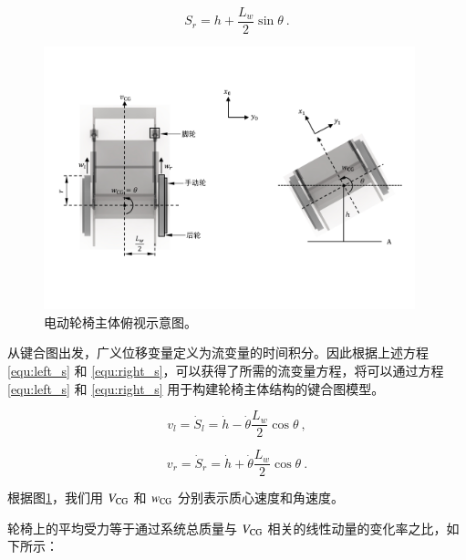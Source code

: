 	\begin{equation}
	\label{equ:right_s}
	S_r = h
	+
	\frac{L_w}{2} \sin \theta
	\ .
	\end{equation}
	
	\begin{figure}[!h]
		\centering
		\includegraphics[width=0.96\textwidth]{fig/top_view.pdf}
		\caption{电动轮椅主体俯视示意图。}\label{fig:top_view}
	\end{figure}
	
	从键合图出发，广义位移变量定义为流变量的时间积分。因此根据上述方程 \ref{equ:left_s} 和 \ref{equ:right_s}，可以获得了所需的流变量方程，将可以通过方程 \ref{equ:left_s} 和 \ref{equ:right_s} 用于构建轮椅主体结构的键合图模型。
	
	\begin{equation}
	\label{equ:left_v}
	v_{l}
	=
	\dot{S}_{l}
	=
	\dot{h}
	-
	\dot{\theta} \frac{L_w}{2} \cos \theta
	\ ,
	\end{equation}
	
	\begin{equation}
	\label{equ:right_v}
	v_{r}
	=
	\dot{S}_{r}
	=
	\dot{h}
	+
	\dot{\theta} \frac{L_w}{2} \cos \theta
	\ .
	\end{equation}
	
	根据图\ref{fig:top_view}，我们用 $ V_{\rm{CG}} $ 和 $ w_{\rm{CG}} $ 分别表示质心速度和角速度。
	
	轮椅上的平均受力等于通过系统总质量与 $ V_{\rm{CG}} $ 相关的线性动量的变化率之比，如下所示：
	
